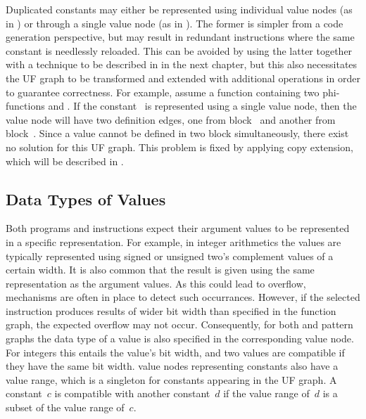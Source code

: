 Duplicated constants may either be represented using individual \glspl{value
  node} (as in ) or through a single
\gls{value node} (as in ).
%
The former is simpler from a \gls{code generation} perspective, but may result
in redundant \glspl{instruction} where the same constant is needlessly reloaded.
%
This can be avoided by using the latter together with a technique to be
described in  in the next chapter, but this
also necessitates the \gls{UF graph} to be transformed and extended with
additional \glspl{operation} in order to guarantee correctness.
%
For example, assume a \gls{function} containing two \glspl{phi-function}
 and
.
%
If the constant~ is represented using a single \gls{value node}, then
the \gls{value node} will have two \glspl{definition edge}, one from
\gls{block}~ and another from \gls{block}~.
%
Since a value cannot be defined in two \gls{block} simultaneously, there exist
no \gls{solution} for this \gls{UF graph}.
%
This problem is fixed by applying \gls{copy extension}, which will be described
in .


\subsection{Data Types of Values}

Both \glspl{program} and \glspl{instruction} expect their argument values to be
represented in a specific representation.
%
For example, in integer arithmetics the values are typically represented using
signed or unsigned two's complement values of a certain width.
%
It is also common that the result is given using the same representation as the
argument values.
%
As this could lead to overflow, mechanisms are often in place to detect such
occurrances.
%
However, if the selected \gls{instruction} produces results of wider bit width
than specified in the \gls{function graph}, the expected overflow may not occur.
%
Consequently, for both  and \glspl{pattern graph} the
data type of a value is also specified in the corresponding \gls{value node}.
%
For integers this entails the value's bit width, and two values are compatible
if they have the same bit width.
%
\Glspl{value node} representing constants also have a value range, which is a
singleton for constants appearing in the \gls{UF graph}.
%
A constant~$c$ is compatible with another constant~$d$ if the value range of~$d$
is a subset of the value range of~$c$.


